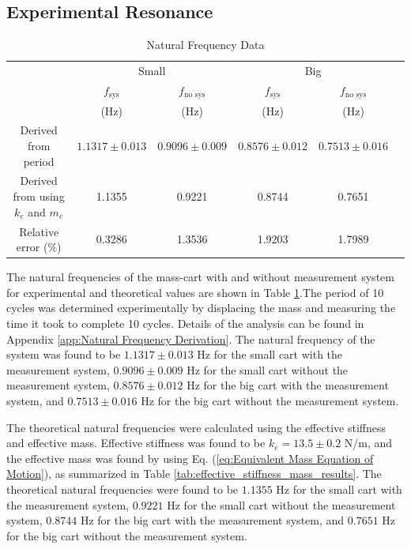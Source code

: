 \subsection{Experimental Resonance}
\begin{table}[H]
    \centering
    \caption{Natural Frequency Data}
    \label{tab:natural_frequency_data_results}
    \begin{tabular}{cccccc}
    \toprule
        & \multicolumn{2}{c}{Small} & \multicolumn{2}{c}{Big} \\
        \cmidrule(lr){2-3} \cmidrule(lr){4-5}
        & $f_{\text{sys}}$ & $f_{\text{no sys}}$ & $f_{\text{sys}}$ & $f_{\text{no sys}}$ \\
        & (Hz) & (Hz) & (Hz) & (Hz) \\
        \midrule
        Derived from period & $1.1317 \pm 0.013$ & $0.9096 \pm 0.009$ & $0.8576 \pm 0.012$ & $0.7513 \pm 0.016$ \\
        Derived from using $k_e$ and $m_e$ & 1.1355 & 0.9221 & 0.8744 & 0.7651 \\
        Relative error (\%) & 0.3286 & 1.3536 & 1.9203 & 1.7989 \\
        \bottomrule
    \end{tabular}
\end{table}
The natural frequencies of the mass-cart with and without measurement system for experimental and theoretical values are shown in Table \ref{tab:natural_frequency_data_results}.The period of 10 cycles was determined experimentally by displacing the mass and measuring the time it took to complete 10 cycles. Details of the analysis can be found in Appendix \ref{app:Natural Frequency Derivation}. The natural frequency of the system was found to be $1.1317 \pm 0.013$ Hz for the small cart with the measurement system, $0.9096 \pm 0.009$ Hz for the small cart without the measurement system, $0.8576 \pm 0.012$ Hz for the big cart with the measurement system, and $0.7513 \pm 0.016$ Hz for the big cart without the measurement system.

The theoretical natural frequencies were calculated using the effective stiffness and effective mass. Effective stiffness was found to be $k_e = 13.5 \pm 0.2$ N/m, and the effective mass was found by using Eq. (\ref{eq:Equivalent Mass Equation of Motion}), as summarized in Table \ref{tab:effective_stiffness_mass_results}. The theoretical natural frequencies were found to be $1.1355$ Hz for the small cart with the measurement system, $0.9221$ Hz for the small cart without the measurement system, $0.8744$ Hz for the big cart with the measurement system, and $0.7651$ Hz for the big cart without the measurement system. 

